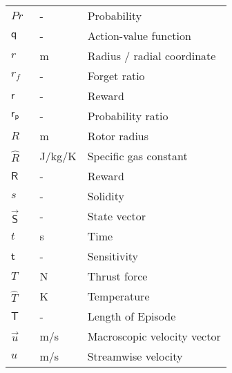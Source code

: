 \begin{longtable}{p{5cm}p{4cm}p{5cm}}
    $Pr$					& \SI{}{-}		& Probability \\
    $\mathsf{q}$			& \SI{}{-}		& Action-value function \\
    $r$						& \SI{}{m}		& Radius / radial coordinate \\
    $r_f$					& \SI{}{-}		& Forget ratio \\
    $\mathsf{r}$			& \SI{}{-}		& Reward \\	
    $\mathsf{r_p}$			& \SI{}{-}		& Probability ratio \\
    $R$						& \SI{}{m}		& Rotor radius \\
    $\hat{R}$               & \SI{}{J/kg/K} & Specific gas constant \\ 
    $\mathsf{R}$			& \SI{}{-}		& Reward \\	
    $s$						& \SI{}{-}		& Solidity \\
    $\vec{\mathsf{S}}$		& \SI{}{-}		& State vector \\
    $t$                     & \SI{}{s}      & Time  \\
    $\mathsf{t}$			& \SI{}{-}		& Sensitivity \\
    $T$                     & \SI{}{N}      & Thrust force \\
    $\hat{T}$				& \SI{}{K}		& Temperature \\
    $\mathsf{T}$			& \SI{}{-}		& Length of Episode \\
    $\vec{u}$               & \SI{}{m/s}    & Macroscopic velocity vector \\
    $u$                     & \SI{}{m/s}    & Streamwise velocity \\

\end{longtable}
